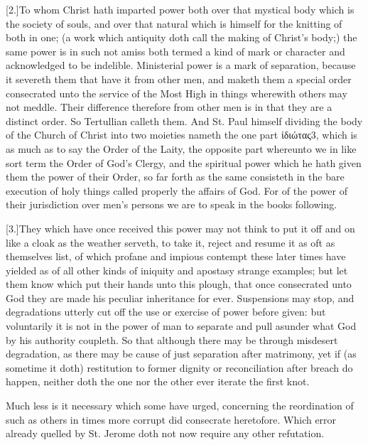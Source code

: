 [2.]To whom Christ hath imparted power both over that mystical body which is the society of souls, and over that natural which is himself for the knitting of both in one; (a work which antiquity doth call the making of Christ’s body;) the same power is in such not amiss both termed a kind of mark or character and acknowledged to be indelible. Ministerial power is a mark of separation, because it severeth them that have it from other men, and maketh them a special order consecrated unto the service of the Most High in things wherewith others may not meddle. Their difference therefore from other men is in that they are a distinct order. So Tertullian calleth them. And St. Paul himself dividing the body of the Church of Christ into two moieties nameth the one part ἰδιώτας3, which is as much as to say the Order of the Laity, the opposite part whereunto we in like sort term the Order of God’s Clergy, and the spiritual power which he hath given them the power of their Order, so far forth as the same consisteth in the bare execution of holy things called properly the affairs of God. For of the power of their  jurisdiction over men’s persons we are to speak in the books following.

[3.]They which have once received this power may not think to put it off and on like a cloak as the weather serveth, to take it, reject and resume it as oft as themselves list, of which profane and impious contempt these later times have yielded as of all other kinds of iniquity and apostasy strange examples; but let them know which put their hands unto this plough, that once consecrated unto God they are made his peculiar inheritance for ever. Suspensions may stop, and degradations utterly cut off the use or exercise of power before given: but voluntarily it is not in the power of man to separate and pull asunder what God by his authority coupleth. So that although there may be through misdesert degradation, as there may be cause of just separation after matrimony, yet if (as sometime it doth) restitution to former dignity or reconciliation after breach do happen, neither doth the one nor the other ever iterate the first knot.

Much less is it necessary which some have urged, concerning the reordination of such as others in times more corrupt did consecrate heretofore. Which error already quelled by St. Jerome doth not now require any other refutation.

